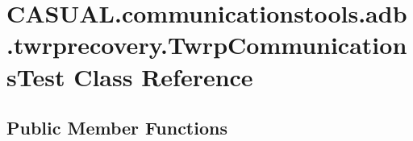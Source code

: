 \hypertarget{class_c_a_s_u_a_l_1_1communicationstools_1_1adb_1_1twrprecovery_1_1_twrp_communications_test}{\section{C\-A\-S\-U\-A\-L.\-communicationstools.\-adb.\-twrprecovery.\-Twrp\-Communications\-Test Class Reference}
\label{class_c_a_s_u_a_l_1_1communicationstools_1_1adb_1_1twrprecovery_1_1_twrp_communications_test}
}
\subsection*{Public Member Functions}
